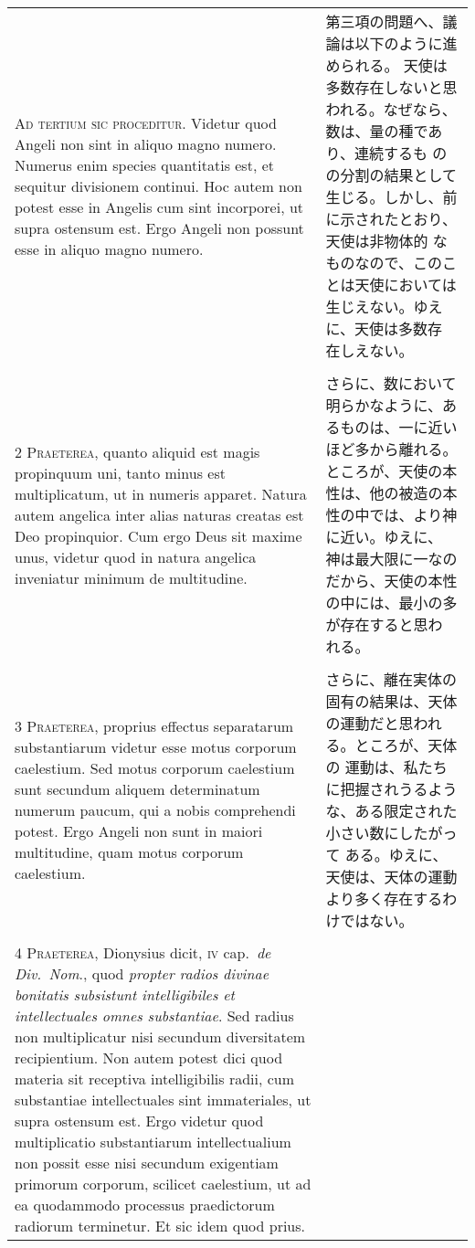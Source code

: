 \documentclass[10pt]{jsarticle} %
\begin{document}
\begin{longtable}{p{21em}p{21em}}

{\huge A}{\scshape d tertium sic proceditur}. Videtur quod
Angeli non sint in aliquo magno numero. Numerus enim species quantitatis
est, et sequitur divisionem continui. Hoc autem non potest esse in
Angelis cum sint incorporei, ut supra ostensum est. Ergo Angeli non
possunt esse in aliquo magno numero.


&

第三項の問題へ、議論は以下のように進められる。
天使は多数存在しないと思われる。なぜなら、数は、量の種であり、連続するも
 のの分割の結果として生じる。しかし、前に示されたとおり、天使は非物体的
 なものなので、このことは天使においては生じえない。ゆえに、天使は多数存
 在しえない。

\\
\\

{\scshape 2 Praeterea}, quanto aliquid est magis
propinquum uni, tanto minus est multiplicatum, ut in numeris
apparet. Natura autem angelica inter alias naturas creatas est Deo
propinquior. Cum ergo Deus sit maxime unus, videtur quod in natura
angelica inveniatur minimum de multitudine.


&
さらに、数において明らかなように、あるものは、一に近いほど多から離れる。
 ところが、天使の本性は、他の被造の本性の中では、より神に近い。ゆえに、
 神は最大限に一なのだから、天使の本性の中には、最小の多が存在すると思わ
 れる。


 \\
\\
 


{\scshape 3 Praeterea}, proprius effectus separatarum
substantiarum videtur esse motus corporum caelestium. Sed motus corporum
caelestium sunt secundum aliquem determinatum numerum paucum, qui a
nobis comprehendi potest. Ergo Angeli non sunt in maiori multitudine,
quam motus corporum caelestium.


&


さらに、離在実体の固有の結果は、天体の運動だと思われる。ところが、天体の
 運動は、私たちに把握されうるような、ある限定された小さい数にしたがって
 ある。ゆえに、天使は、天体の運動より多く存在するわけではない。

\\\\


{\scshape 4 Praeterea}, Dionysius dicit, {\scshape iv} cap.~{\itshape de
Div.~Nom}., quod {\itshape propter radios divinae bonitatis subsistunt
intelligibiles et intellectuales omnes substantiae}. Sed radius non
multiplicatur nisi secundum diversitatem recipientium. Non autem potest
dici quod materia sit receptiva intelligibilis radii, cum substantiae
intellectuales sint immateriales, ut supra ostensum est. Ergo videtur
quod multiplicatio substantiarum intellectualium non possit esse nisi
secundum exigentiam primorum corporum, scilicet caelestium, ut ad ea
quodammodo processus praedictorum radiorum terminetur. Et sic idem quod
prius.



\end{longtable}
\end{document}
